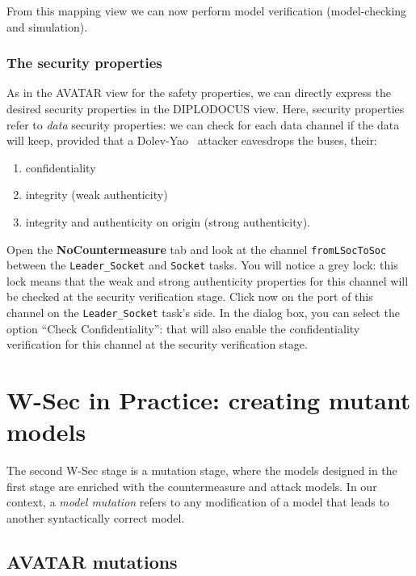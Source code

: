 \documentclass{article}
\begin{document}
From this mapping view we can now perform model verification (model-checking and simulation).

\subsubsection{The security properties}

As in the AVATAR view for the safety properties, we can directly express the desired security properties in the DIPLODOCUS view. Here, security properties refer to \emph{data} security properties: we can check for each data channel if the data will keep, provided that a Dolev-Yao~\cite{dolevyao} attacker eavesdrops the buses, their:
\begin{enumerate}
	\item confidentiality
	\item integrity (weak authenticity)
	\item integrity and authenticity on origin (strong authenticity).
\end{enumerate}
Open the \textbf{NoCountermeasure} tab and look at the channel \texttt{fromLSocToSoc} between the \texttt{Leader\_Socket} and \texttt{Socket} tasks. You will notice a grey lock: this lock means that the weak and strong authenticity properties for this channel will be checked at the security verification stage. Click now on the port of this channel on the \texttt{Leader\_Socket} task's side. In the dialog box, you can select the option ``Check Confidentiality'': that will also enable the confidentiality verification for this channel at the security verification stage.



\section{W-Sec in Practice: creating mutant models}

The second W-Sec stage is a mutation stage, where the models designed in the first stage are enriched with the countermeasure and attack models. In our context, a \emph{model mutation} refers to any modification of a model that leads to another syntactically correct model.

\subsection{AVATAR mutations}
\end{document}
